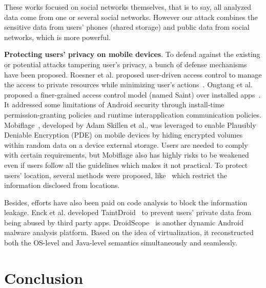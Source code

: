 \documentclass{sig-alternate}
\begin{document}
These works focused on social networks themselves, that is to say, all analyzed data come from one or several social networks. However our attack combines the sensitive data from users' phones (shared storage) and public data from social networks, which is more powerful.


\noindent\textbf{Protecting users' privacy on mobile devices}. To defend against the existing or potential attacks tampering user's privacy, a bunch of defense mechanisms have been proposed. Roesner et al. proposed user-driven access control to manage the access to private resources while minimizing user's actions~\cite{roesner2012user}. Ongtang et al. proposed a finer-grained access control model (named Saint) over installed apps~\cite{ongtang2012semantically}. It addressed some limitations of Android security through install-time permission-granting policies and runtime interapplication communication policies. Mobiflage~\cite{skillen2013implementing}, developed by Adam Skillen et al., was leveraged to enable Plausibly Deniable Encryption (PDE) on mobile devices by hiding encrypted volumes within random data on a device external storage. Users are needed to comply with certain requirements, but Mobiflage also has highly risks to be weakened even if users follow all the guidelines which makes it not practical. To protect users' location, several methods were proposed, like~\cite{shokri2012protecting} which restrict the information disclosed from locations.

Besides, efforts have also been paid on code analysis to block the information leakage. Enck et al. developed TaintDroid~\cite{enck2010taintdroid} to prevent users' private data from being abused by third party apps. DroidScope~\cite{yan2012droidscope} is another dynamic Android malware analysis platform. Based on the idea of virtualization, it reconstructed both the OS-level and Java-level semantics simultaneously and seamlessly.



\section{Conclusion}
\label{sec:conclusion}
\end{document}
